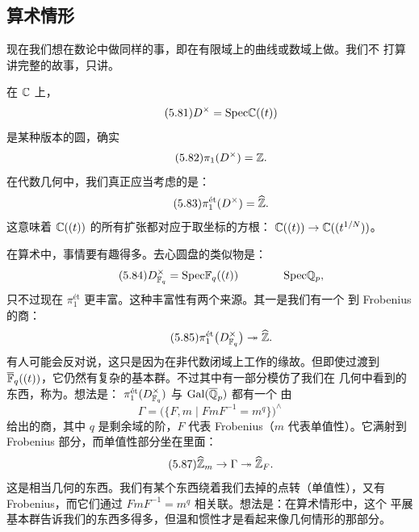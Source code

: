 \subsection{算术情形}
\label{sec:5-3-2}

现在我们想在数论中做同样的事，即在有限域上的曲线或数域上做。我们不
打算讲完整的故事，只讲。

在 $\mathbb{C}$ 上，
\begin{equation}\tag{5.81}
D^{\times}=\mathrm{Spec}\mathbb{C}((t))
\end{equation}
是某种版本的圆，确实
\begin{equation}\tag{5.82}
\pi_{1}(D^{\times})=\mathbb{Z}.
\end{equation}
在代数几何中，我们真正应当考虑的是：
\begin{equation}\tag{5.83}
\pi_{1}^{\text{ét}}(D^{\times})=\widehat{\mathbb{Z}}.
\end{equation}
这意味着 $\mathbb{C}((t))$ 的所有扩张都对应于取坐标的方根：
$\mathbb{C}((t))\to\mathbb{C}((t^{1/N}))$。

在算术中，事情要有趣得多。去心圆盘的类似物是：
\begin{equation}\tag{5.84}
D^{\times}_{\mathbb{F}_{q}}=\mathrm{Spec}\mathbb{F}_{q}((t))\qquad\qquad\mathrm{Spec}\mathbb{Q}_{p},
\end{equation}
只不过现在 $\pi_{1}^{\text{ét}}$ 更丰富。这种丰富性有两个来源。其一是我们有一个
到 Frobenius 的商：
\begin{equation}\tag{5.85}
\pi_{1}^{\text{ét}}\bigl(D^{\times}_{\mathbb{F}_{q}}\bigr)\twoheadrightarrow\widehat{\mathbb{Z}}.
\end{equation}
有人可能会反对说，这只是因为在非代数闭域上工作的缘故。但即使过渡到
$\overline{\mathbb{F}}_{q}((t))$，它仍然有复杂的基本群。不过其中有一部分模仿了我们在
几何中看到的东西，称为。想法是：
$\pi_{1}^{\text{ét}}(D^{\times}_{\mathbb{F}_{q}})$ 与 $\mathrm{Gal}(\overline{\mathbb{Q}}_{p})$ 都有一个
由
\begin{equation}\tag{5.86}
\Gamma=\bigl(\{F,m\mid FmF^{-1}=m^{q}\}\bigr)^{\wedge}
\end{equation}
给出的商，其中 $q$ 是剩余域的阶，$F$ 代表 Frobenius（$m$ 代表单值性）。它满射到
Frobenius 部分，而单值性部分坐在里面：
\begin{equation}\tag{5.87}
\widehat{\mathbb{Z}}_{m}\to\Gamma\twoheadrightarrow\widehat{\mathbb{Z}}_{F}.
\end{equation}
这是相当几何的东西。我们有某个东西绕着我们去掉的点转（单值性），又有
Frobenius，而它们通过 $FmF^{-1}=m^{q}$ 相关联。想法是：在算术情形中，这个
平展基本群告诉我们的东西多得多，但温和惯性才是看起来像几何情形的那部分。


